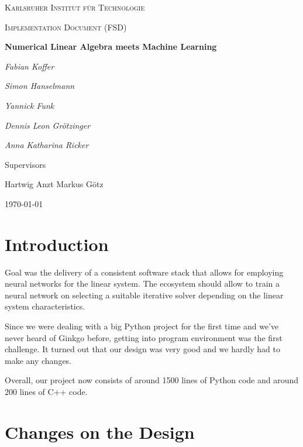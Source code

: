 \documentclass[parskip=full]{scrartcl}
\begin{document}
\begin{titlepage}
\centering
{\scshape\LARGE Karlsruher Institut für Technologie\par}
\vspace{1cm}
{\scshape\Large Implementation Document (FSD)\par}
\vspace{1.5cm}
{\huge\bfseries Numerical Linear Algebra meets Machine Learning \par}
\vspace {2cm}

{\Large\itshape Fabian Koffer\par}
{\Large\itshape Simon Hanselmann\par}
{\Large\itshape Yannick Funk\par}
{\Large\itshape Dennis Leon Gr\"{o}tzinger\par}
{\Large\itshape Anna Katharina Ricker\par}

\vfill
Supervisors\par
Hartwig Anzt
Markus G\"{o}tz

\vfill
{\large\today\par}
\end{titlepage}

\tableofcontents
\newpage


\section{Introduction}
Goal was the delivery of a consistent software stack that allows for employing \glspl{neural network} for the linear system. 
The ecosystem should allow to train a \gls{neural network} on selecting a suitable \gls{iterative solver} depending on the linear system characteristics.

Since we were dealing with a big Python project for the first time and we've never heard of Ginkgo before, getting into program environment was the first challenge.
It turned out that our design was very good and we hardly had to make any changes.

Overall, our project now consists of around 1500 lines of Python code and around 200 lines of C++ code.


\section{Changes on the Design}
\end{document}
